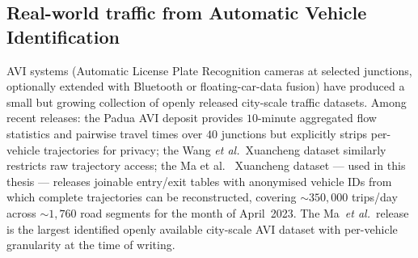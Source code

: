 \subsection{Real-world traffic from Automatic Vehicle Identification}
\label{sec:avi-prior}

AVI systems (Automatic License Plate Recognition cameras at selected
junctions, optionally extended with Bluetooth or floating-car-data
fusion) have produced a small but growing collection of openly
released city-scale traffic datasets. Among recent releases:
the Padua AVI deposit \cite{cappi2026} provides $10$-minute aggregated
flow statistics and pairwise travel times over $40$ junctions but
explicitly strips per-vehicle trajectories for privacy; the
Wang \emph{et al.}\ Xuancheng dataset \cite{wang2023xuancheng}
similarly restricts raw trajectory access; the
Ma et al.~\cite{ma2026xuancheng} Xuancheng dataset --- used in this thesis ---
releases joinable entry/exit tables with anonymised vehicle IDs from
which complete trajectories can be reconstructed, covering
$\sim 350{,}000$ trips/day across $\sim 1{,}760$ road segments for the
month of April~2023. The Ma~\emph{et al.}\ release is the largest
identified openly available city-scale AVI dataset with
per-vehicle granularity at the time of writing.
